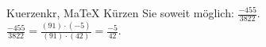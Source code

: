 \begin{MAufgabe}{Kuerzen}{kr, MaTeX}
K\"urzen Sie soweit m\"oglich: $\frac{-455}{3822}$.\\ 
\ifLsg\MLoesung
\quad $\frac{-455}{3822}=\frac{(91)\cdot(-5)}{(91)\cdot(42)}=\frac{-5}{42}$.\else\relax\fi
 \end{MAufgabe}